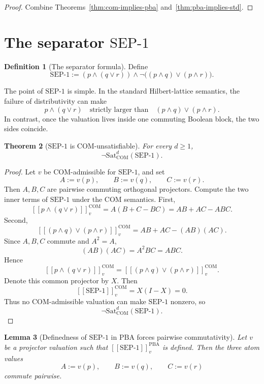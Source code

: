 \documentclass[11pt]{article}
\theoremstyle{plain}
\newtheorem{theorem}{Theorem}[section]
\newtheorem{lemma}[theorem]{Lemma}
\theoremstyle{definition}
\newtheorem{definition}[theorem]{Definition}
\newcommand{\COM}{\mathrm{COM}}
\newcommand{\PBA}{\mathrm{PBA}}
\newcommand{\Sat}{\mathrm{Sat}}
\newcommand{\SEPone}{\mathrm{SEP}\text{-}1}
\newcommand{\sem}[1]{\left[\!\left[#1\right]\!\right]}
\begin{document}
\begin{proof}
Combine Theorems~\ref{thm:com-implies-pba} and~\ref{thm:pba-implies-std}.
\end{proof}

\section{The separator \texorpdfstring{$\SEPone$}{SEP-1}}

\begin{definition}[The separator formula]
Define
\[
\SEPone := (p\wedge(q\vee r))\wedge \neg\bigl((p\wedge q)\vee(p\wedge r)\bigr).
\]
\end{definition}

The point of $\SEPone$ is simple.
In the standard Hilbert-lattice semantics, the failure of distributivity can make
\[
 p\wedge(q\vee r)
\quad\text{strictly larger than}\quad
 (p\wedge q)\vee(p\wedge r).
\]
In contrast, once the valuation lives inside one commuting Boolean block, the two sides coincide.

\begin{theorem}[\(\SEPone\) is COM-unsatisfiable]\label{thm:sep1-com-unsat}
For every $d\geq 1$,
\[
\neg\Sat_{\COM}^d(\SEPone).
\]
\end{theorem}

\begin{proof}
Let $v$ be COM-admissible for $\SEPone$, and set
\[
A:=v(p),\qquad B:=v(q),\qquad C:=v(r).
\]
Then $A,B,C$ are pairwise commuting orthogonal projectors.
Compute the two inner terms of $\SEPone$ under the COM semantics.
First,
\[
\sem{p\wedge(q\vee r)}^{\COM}_v
=
A(B+C-BC)
=
AB+AC-ABC.
\]
Second,
\[
\sem{(p\wedge q)\vee(p\wedge r)}^{\COM}_v
=
AB+AC-(AB)(AC).
\]
Since $A,B,C$ commute and $A^2=A$,
\[
(AB)(AC)=A^2BC=ABC.
\]
Hence
\[
\sem{p\wedge(q\vee r)}^{\COM}_v
=
\sem{(p\wedge q)\vee(p\wedge r)}^{\COM}_v.
\]
Denote this common projector by $X$.
Then
\[
\sem{\SEPone}^{\COM}_v = X(I-X)=0.
\]
Thus no COM-admissible valuation can make $\SEPone$ nonzero, so
\[
\neg\Sat_{\COM}^d(\SEPone).
\]
\end{proof}

\begin{lemma}[Definedness of \texorpdfstring{$\SEPone$}{SEP-1} in \(\PBA\) forces pairwise commutativity]\label{lem:sep1-definedness}
Let $v$ be a projector valuation such that $\sem{\SEPone}^{\PBA}_v$ is defined.
Then the three atom values
\[
A:=v(p),\qquad B:=v(q),\qquad C:=v(r)
\]
commute pairwise.
\end{lemma}
\end{document}
